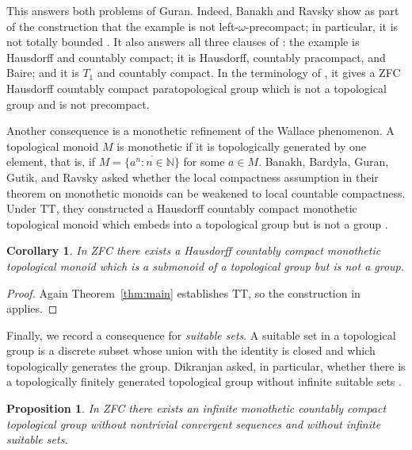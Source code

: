 \documentclass[11pt]{amsart}
\newtheorem{corollary}[theorem]{Corollary}
\newtheorem{proposition}[theorem]{Proposition}
\theoremstyle{definition}
\newcommand{\N}{\mathbb N}
\begin{document}
This answers both problems of Guran.  Indeed, Banakh and Ravsky show as part
of the construction that the example is not left-$\omega$-precompact; in
particular, it is not totally bounded
\cite[Example~3.22 and the discussion following it]{BanakhRavsky2020}.  It
also answers all three clauses of
\cite[Problem~3.23]{BanakhRavsky2020}: the example is Hausdorff and countably
compact; it is Hausdorff, countably pracompact, and Baire; and it is $T_1$ and
countably compact.  In the terminology of
\cite[Problems~2.4.1 and~2.4.3]{ArhangelskiiTkachenko2008}, it gives a ZFC
Hausdorff countably compact paratopological group which is not a topological
group and is not precompact.

Another consequence is a monothetic refinement of the Wallace phenomenon.
A topological monoid $M$ is monothetic if it is topologically generated by one
element, that is, if $M=\overline{\{a^n:n\in\N\}}$ for some $a\in M$.  Banakh,
Bardyla, Guran, Gutik, and Ravsky asked whether the local compactness assumption
in their theorem on monothetic monoids can be weakened to local countable
compactness.  Under \(\mathrm{TT}\), they constructed a Hausdorff
countably compact monothetic topological monoid which embeds into a topological
group but is not a group \cite[Remark~4.5]{BanakhBardylaGuranGutikRavsky2020}.

\begin{corollary}\label{cor:monothetic-monoid}
In ZFC there exists a Hausdorff countably compact monothetic topological
monoid which is a submonoid of a topological group but is not a group.
\end{corollary}

\begin{proof}
Again Theorem~\ref{thm:main} establishes \(\mathrm{TT}\), so the construction
in \cite[Remark~4.5]{BanakhBardylaGuranGutikRavsky2020} applies.
\end{proof}

Finally, we record a consequence for \emph{suitable sets}.  A suitable set in a
topological group is a discrete subset whose union with the identity is closed
and which topologically generates the group.  Dikranjan asked, in particular,
whether there is a topologically finitely generated topological group without
infinite suitable sets \cite[Question~5.4]{Dikranjan1999}.

\begin{proposition}\label{prop:suitable-sets}
In ZFC there exists an infinite monothetic countably compact topological group
without nontrivial convergent sequences and without infinite suitable sets.
\end{proposition}
\end{document}
